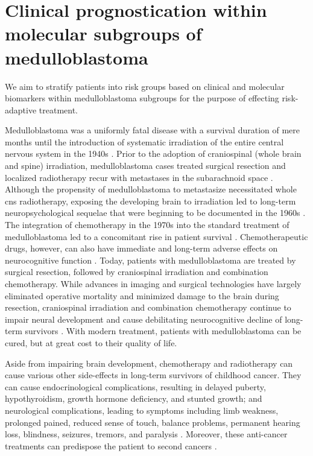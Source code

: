 \chapter{Clinical prognostication within molecular subgroups of medulloblastoma}
\label{ch:clin-prog}

\begin{objective}
We aim to stratify patients into risk groups based on clinical and molecular biomarkers within medulloblastoma subgroups for the purpose of effecting risk-adaptive treatment.
\end{objective}

Medulloblastoma was a uniformly fatal disease with a survival duration of mere months until the introduction of systematic irradiation of the entire central nervous system in the 1940s . Prior to the adoption of craniospinal (whole brain and spine) irradiation, medulloblastoma cases treated surgical resection and localized radiotherapy recur with metastases in the subarachnoid space . Although the propensity of medulloblastoma to metastasize necessitated whole \gls{cns} radiotherapy, exposing the developing brain to irradiation led to long-term neuropsychological sequelae that were beginning to be documented in the 1960s . The integration of chemotherapy in the 1970s into the standard treatment of medulloblastoma led to a concomitant rise in patient survival . Chemotherapeutic drugs, however, can also have immediate and long-term adverse effects on neurocognitive function . Today, patients with medulloblastoma are treated by surgical resection, followed by craniospinal irradiation and combination chemotherapy. While advances in imaging and surgical technologies have largely eliminated operative mortality and minimized damage to the brain during resection, craniospinal irradiation and combination chemotherapy continue to impair neural development and cause debilitating neurocognitive decline of long-term survivors . With modern treatment, patients with medulloblastoma can be cured, but at great cost to their quality of life.

Aside from impairing brain development, chemotherapy and radiotherapy can cause various other side-effects in long-term survivors of childhood cancer. They can cause endocrinological complications, resulting in delayed puberty, hypothyroidism, growth hormone deficiency, and stunted growth; and neurological complications, leading to symptoms including limb weakness, prolonged pained, reduced sense of touch, balance problems, permanent hearing loss, blindness, seizures, tremors, and paralysis . Moreover, these anti-cancer treatments can predispose the patient to second cancers .

